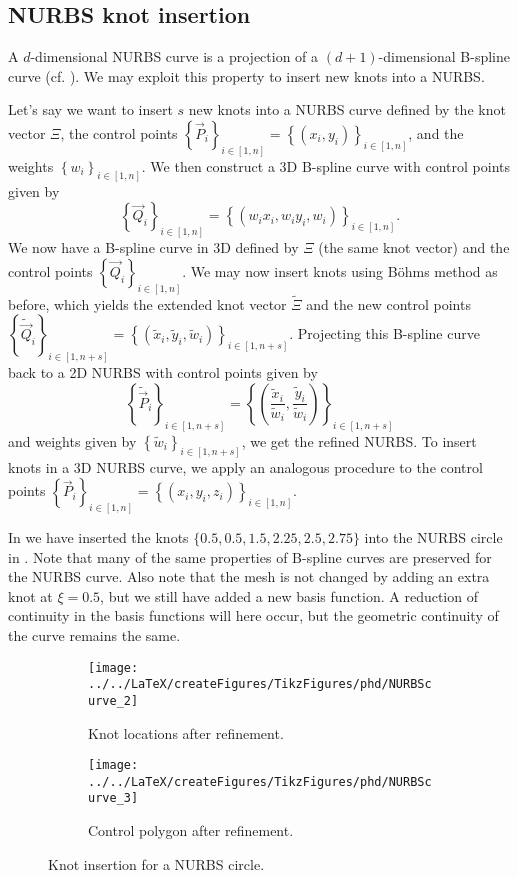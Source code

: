 \subsection{NURBS knot insertion}
A $d$-dimensional NURBS curve is a projection of a $(d+1)$-dimensional B-spline curve (cf. \cite{Cottrell2009iat}). We may exploit this property to insert new knots into a NURBS. 

Let's say we want to insert $s$ new knots into a NURBS curve defined by the knot vector $\Xi$, the control points $\left\{\vec{P}_i\right\}_{i\in[1,n]}=\left\{(x_i,y_i)\right\}_{i\in[1,n]}$, and the weights $\left\{w_i\right\}_{i\in[1,n]}$. We then construct a 3D B-spline curve with control points given by
\begin{equation*}
	\left\{\vec{Q}_i\right\}_{i\in[1,n]} = \left\{(w_i x_i, w_i y_i, w_i)\right\}_{i\in[1,n]}.
\end{equation*}
We now have a B-spline curve in 3D defined by $\Xi$ (the same knot vector) and the control points $\left\{\vec{Q}_i\right\}_{i\in[1,n]}$. We may now insert knots using B\"{o}hms method as before, which yields the extended knot vector $\tilde{\Xi}$ and the new control points $\left\{\tilde{\vec{Q}}_i\right\}_{i\in[1,n+s]} = \left\{(\tilde{x}_i, \tilde{y}_i, \tilde{w}_i)\right\}_{i\in[1,n+s]}$. Projecting this B-spline curve back to a 2D NURBS with control points given by
\begin{equation*}
	\left\{\tilde{\vec{P}}_i\right\}_{i\in[1,n+s]} = \left\{\left(\frac{\tilde{x}_i}{\tilde{w}_i}, \frac{\tilde{y}_i}{\tilde{w}_i}\right)\right\}_{i\in[1,n+s]}
\end{equation*}
and weights given by $\left\{\tilde{w}_i\right\}_{i\in[1,n+s]}$, we get the refined NURBS. To insert knots in a 3D NURBS curve, we apply an analogous procedure to the control points $\left\{\vec{P}_i\right\}_{i\in[1,n]}=\left\{(x_i,y_i,z_i)\right\}_{i\in[1,n]}$.

In  we have inserted the knots $\{0.5, 0.5, 1.5, 2.25, 2.5, 2.75\}$ into the NURBS circle in . Note that many of the same properties of B-spline curves are preserved for the NURBS curve. Also note that the mesh is not changed by adding an extra knot at $\xi = 0.5$, but we still have added a new basis function. A reduction of continuity in the basis functions will here occur, but the geometric continuity of the curve remains the same.

\begin{figure}
	\centering    
	\begin{subfigure}{0.49\textwidth}
		\centering
		\texttt{[image: ../../LaTeX/createFigures/TikzFigures/phd/NURBScurve\_2]} 
		\caption{Knot locations after refinement.}
	\end{subfigure}%
	\hspace*{0.02\textwidth}%
	\begin{subfigure}{0.49\textwidth}
		\centering
		\texttt{[image: ../../LaTeX/createFigures/TikzFigures/phd/NURBScurve\_3]} 
		\caption{Control polygon after refinement.}
	\end{subfigure}      
	\caption{Knot insertion for a NURBS circle.}\label{Fig:NURBScurveRefined}
\end{figure}


